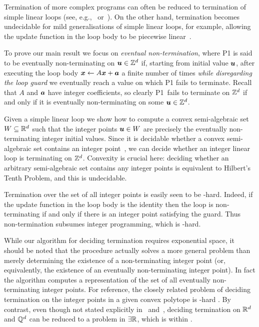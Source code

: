 Termination of more complex programs can often be reduced to
termination of simple linear loops (see, e.g.,~\cite{CookPR06}
or~\cite[Section 6]{Tiw04}).  On the other hand, termination becomes
undecidable for mild generalisations of simple linear loops, for
example, allowing the update function in the loop body to be piecewise
linear~\cite{BGM12}.

To prove our main result we focus on \emph{eventual non-termination},
where \textsf{P1} is said to be eventually non-terminating on
$\boldsymbol{u} \in \mathbb{Z}^{d}$ if, starting from initial value
$\boldsymbol{u}$, after executing the loop body $\boldsymbol{x} \gets
A\boldsymbol{x}+\boldsymbol{a}$ a finite number of times \emph{while
  disregarding the loop guard} we eventually reach a value on which
\textsf{P1} fails to terminate.  Recall that $A$ and $\boldsymbol{a}$
have integer coefficients, so clearly \textsf{P1}~fails to
terminate on $\mathbb{Z}^{d}$ if and only if it is eventually
non-terminating on some $\boldsymbol{u} \in \mathbb{Z}^{d}$.

Given a simple linear loop we show how to compute a convex
semi-algebraic set $W \subseteq \mathbb{R}^{d}$ such that the integer
points $\boldsymbol{u} \in W$ are precisely the eventually
non-terminating integer initial values.  Since it is decidable whether
a convex semi-algebraic set contains an integer
point~\cite{KhachiyanP97}, we can
decide whether an integer linear loop is terminating on
$\mathbb{Z}^{d}$. Convexity is crucial here: deciding whether an arbitrary
semi-algebraic set contains any integer points is equivalent to
Hilbert's Tenth Problem, and this is undecidable.

Termination over the set of all integer points is easily seen to be
\coNP-hard.  Indeed, if the update function in the loop body
is the identity then the loop is non-terminating if and only if there
is an integer point satisfying the guard.  Thus non-termination
subsumes integer programming, which is \NP-hard.

While our algorithm for deciding termination requires exponential
space, it should be noted that the procedure actually solves a more
general problem than merely determining the existence of a
non-terminating integer point (or, equivalently, the existence of an
eventually non-terminating integer point).  In fact the algorithm
computes a representation of the set of all eventually non-terminating
integer points.  For reference, the closely related problem of
deciding termination on the integer points in a given convex polytope is
\EXPSPACE-hard \cite{BGM12}. By contrast, even though not stated explicitly in~\cite{Tiw04} and~\cite{Bra06}, deciding termination on $\mathbb{R}^{d}$ and $\mathbb{Q}^{d}$ can be reduced to a problem in $\exists \mathbb{R}$, which is within \PSPACE.

